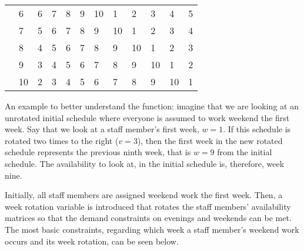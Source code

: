 \begin{table}[H]
\begin{tabular}{llllllllllll}
    & \multicolumn{1}{l|}{6}  & \multicolumn{1}{l|}{6}  & \multicolumn{1}{l|}{7}  & \multicolumn{1}{l|}{8}  & \multicolumn{1}{l|}{9}  & \multicolumn{1}{l|}{10} & \multicolumn{1}{l|}{1}  & \multicolumn{1}{l|}{2}  & \multicolumn{1}{l|}{3}  & \multicolumn{1}{l|}{4}  & \multicolumn{1}{l|}{5}  \\ \cline{3-12} 
    & \multicolumn{1}{l|}{7}  & \multicolumn{1}{l|}{5}  & \multicolumn{1}{l|}{6}  & \multicolumn{1}{l|}{7}  & \multicolumn{1}{l|}{8}  & \multicolumn{1}{l|}{9}  & \multicolumn{1}{l|}{10} & \multicolumn{1}{l|}{1}  & \multicolumn{1}{l|}{2}  & \multicolumn{1}{l|}{3}  & \multicolumn{1}{l|}{4}  \\ \cline{3-12} 
    & \multicolumn{1}{l|}{8}  & \multicolumn{1}{l|}{4}  & \multicolumn{1}{l|}{5}  & \multicolumn{1}{l|}{6}  & \multicolumn{1}{l|}{7}  & \multicolumn{1}{l|}{8}  & \multicolumn{1}{l|}{9}  & \multicolumn{1}{l|}{10} & \multicolumn{1}{l|}{1}  & \multicolumn{1}{l|}{2}  & \multicolumn{1}{l|}{3}  \\ \cline{3-12} 
    & \multicolumn{1}{l|}{9}  & \multicolumn{1}{l|}{3}  & \multicolumn{1}{l|}{4}  & \multicolumn{1}{l|}{5}  & \multicolumn{1}{l|}{6}  & \multicolumn{1}{l|}{7}  & \multicolumn{1}{l|}{8}  & \multicolumn{1}{l|}{9}  & \multicolumn{1}{l|}{10} & \multicolumn{1}{l|}{1}  & \multicolumn{1}{l|}{2}  \\ \cline{3-12} 
    & \multicolumn{1}{l|}{10} & \multicolumn{1}{l|}{2}  & \multicolumn{1}{l|}{3}  & \multicolumn{1}{l|}{4}  & \multicolumn{1}{l|}{5}  & \multicolumn{1}{l|}{6}  & \multicolumn{1}{l|}{7}  & \multicolumn{1}{l|}{8}  & \multicolumn{1}{l|}{9}  & \multicolumn{1}{l|}{10} & \multicolumn{1}{l|}{1}  \\ \cline{3-12} 
\end{tabular}
\end{table}
An example to better understand the function: imagine that we are looking at an unrotated initial schedule where everyone is assumed to work weekend the first week. Say that we look at a staff member's first week, $w=1$. If this schedule is rotated two times to the right ($v=3$), then the first week in the new rotated schedule represents the previous ninth week, that is $w=9$ from the initial schedule. The availability to look at, in the initial schedule is, therefore, week nine.

Initially, all staff members are assigned weekend work the first week. Then, a week rotation variable is introduced that rotates the staff members' availability matrices so that the demand constraints on evenings and weekends can be met. The most basic constraints, regarding which week a staff member's weekend work occurs and its week rotation, can be seen below.

